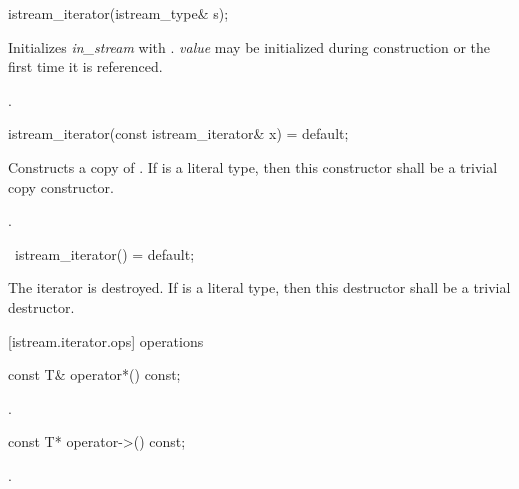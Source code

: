 %
\begin{itemdecl}
istream_iterator(istream_type& s);
\end{itemdecl}

\begin{itemdescr}
\pnum
\effects
Initializes \textit{in_stream} with . \textit{value} may be initialized during
construction or the first time it is referenced.

\pnum
\postcondition {}.
\end{itemdescr}

%
\begin{itemdecl}
istream_iterator(const istream_iterator& x) = default;
\end{itemdecl}

\begin{itemdescr}
\pnum
\effects
Constructs a copy of . If  is a literal type, then this constructor shall be a trivial copy constructor.

\pnum
\postcondition {}.
\end{itemdescr}

%
\begin{itemdecl}
~istream_iterator() = default;
\end{itemdecl}

\begin{itemdescr}
\pnum
\effects
The iterator is destroyed. If  is a literal type, then this destructor shall be a trivial destructor.
\end{itemdescr}

[istream.iterator.ops]{ operations}

%
%
\begin{itemdecl}
const T& operator*() const;
\end{itemdecl}

\begin{itemdescr}
\pnum
\returns
{}.
\end{itemdescr}

{\color{newclr}
%
%
\begin{itemdecl}
const T* operator->() const;
\end{itemdecl}

\begin{itemdescr}
\pnum
\returns
{}.

\end{itemdescr}
}


